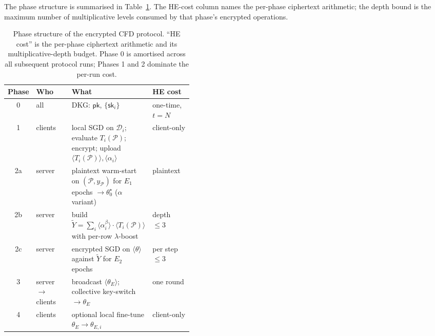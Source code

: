 The phase structure is summarised in Table~\ref{tab:cfd_phases}. The HE-cost column names the per-phase ciphertext arithmetic; the depth bound is the maximum number of multiplicative levels consumed by that phase's encrypted operations.

\begin{table}[t]
\centering
\small
\caption{Phase structure of the encrypted CFD protocol. ``HE cost'' is the per-phase ciphertext arithmetic and its multiplicative-depth budget. Phase 0 is amortised across all subsequent protocol runs; Phases 1 and 2 dominate the per-run cost.}
\label{tab:cfd_phases}
\begin{tabular}{@{}c l p{0.42\linewidth} l@{}}
\toprule
Phase & Who & What & HE cost \\
\midrule
0 & all & DKG: $\mathsf{pk}$, $\{\mathsf{sk}_i\}$ & one-time, $t{=}N$ \\
1 & clients & local SGD on $\mathcal D_i$; evaluate $T_i(\mathcal P)$; encrypt; upload $\langle T_i(\mathcal P)\rangle, \langle\alpha_i\rangle$ & client-only \\
2a & server & plaintext warm-start on $(\mathcal P, y_{\mathcal P})$ for $E_1$ epochs $\rightarrow \theta_0^\star$ ($\alpha$ variant) & plaintext \\
2b & server & build $\widetilde Y = \sum_i \langle\alpha_i^\beta\rangle\cdot\langle T_i(\mathcal P)\rangle$ with per-row $\lambda$-boost & depth $\leq 3$ \\
2c & server & encrypted SGD on $\langle\theta\rangle$ against $\widetilde Y$ for $E_2$ epochs & per step $\leq 3$ \\
3 & server $\to$ clients & broadcast $\langle\theta_E\rangle$; collective key-switch $\to \theta_E$ & one round \\
4 & clients & optional local fine-tune $\theta_E \to \theta_{E,i}$ & client-only \\
\bottomrule
\end{tabular}
\end{table}


